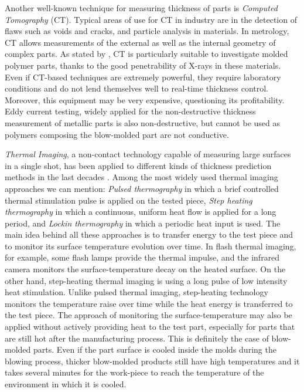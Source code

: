 Another well-known technique for measuring thickness of parts is \textit{Computed Tomography} (CT). Typical areas of use for CT in industry are in the detection of flaws such as voids and cracks, and particle analysis in materials. In metrology, CT allows measurements of the external as well as the internal geometry of complex parts. As stated by \citet{de2014industrial}, CT is particularly suitable to investigate molded polymer parts, thanks to the good penetrability of X-rays in these materials. Even if CT-based techniques are extremely powerful, they require laboratory conditions and  do not lend themselves well to real-time thickness control. Moreover, this equipment may be very expensive, questioning its profitability.
%
Eddy current testing, widely applied for the non-destructive thickness measurement of metallic parts \citep{cheng2017thickness,mao2016thickness,wang2015noncontact,yin2007thickness}  is also non-destructive, but cannot be used as polymers composing the blow-molded part are not conductive.

\textit{Thermal Imaging}, a non-contact technology capable of measuring large surfaces in a single shot, has been applied to different kinds of thickness prediction methods in the last decades \citep{sun2003method,sun2006analysis,choi2008quantitative,benitez2008definition,zeng2012absolute,li2018thickness,he2013eddy}. Among the most widely used thermal imaging approaches we can mention: \textit{Pulsed thermography} in which a brief controlled thermal stimulation pulse is applied on the tested piece, \textit{Step heating thermography} in which a continuous, uniform heat flow is applied for a long period, and \textit{Lockin thermography} in which a periodic heat input is used. The main idea behind all these approaches is to transfer energy to the test piece and to monitor its surface temperature evolution over time. In flash thermal imaging, for example, some flash lamps provide the thermal impulse, and the infrared camera monitors the surface-temperature decay on the heated surface. On the other hand, step-heating thermal imaging is using a long pulse of low intensity heat stimulation. Unlike pulsed thermal imaging, step-heating technology monitors the temperature raise over time while the heat energy is transferred to the test piece.
The approach of monitoring the surface-temperature may also be applied without actively providing heat to the test part, especially for parts that are still hot after the manufacturing process. This is definitely the case of blow-molded parts. Even if the part surface is cooled inside the molds during the blowing process, thicker blow-molded products still have high temperatures and it takes several minutes for the work-piece to reach the temperature of the environment in which it is cooled.

